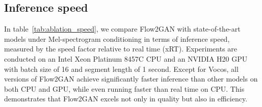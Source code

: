  
\begin{table}[h!]
\centering
\caption{Ablation study of model structure on LibriTTS dev set with Mel-spectrogram conditioning.}
\vspace{-0.5em}
\label{tab:ablation_network}
\setlength{\tabcolsep}{6pt} %
\vspace{-0.5em}
\end{table}

\subsection{Inference speed}
\label{ssec:speed}

In table~\ref{tab:ablation_speed}, we compare Flow2GAN with state-of-the-art models under Mel-spectrogram conditioning in terms of inference speed, measured by the speed factor relative to real time (xRT). Experiments are conducted on an Intel Xeon Platinum 8457C CPU and an NVIDIA H20 GPU with batch size of 16 and segment length of 1 second. 
Except for Vocos, 
all versions of Flow2GAN achieve significantly faster inference than other models on both CPU and GPU, while even running faster than real time on CPU. This demonstrates that Flow2GAN excels not only in quality but also in efficiency.

